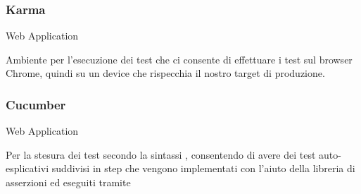\documentclass[../../../analisi-dei-requisiti.tex]{subfiles}
\begin{document}

\subsubsection{Karma}%
\label{subs:karma}
Web Application

Ambiente per l’esecuzione dei test che ci consente di effettuare i test sul browser Chrome, quindi su un device che rispecchia il nostro target di produzione.

\subsubsection{Cucumber}%
\label{subs:cucumber}
Web Application

Per la stesura dei test secondo la sintassi , consentendo di avere dei test auto-esplicativi suddivisi in step che vengono implementati con l’aiuto della libreria di asserzioni  ed eseguiti tramite 
\end{document}
